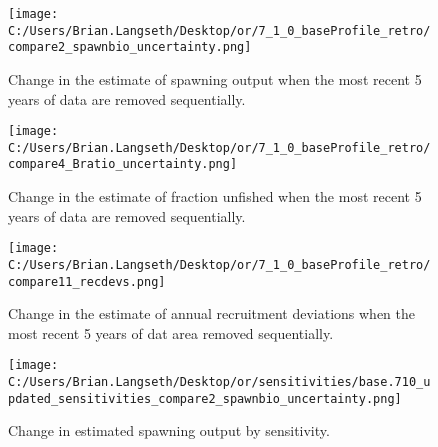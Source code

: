 \documentclass[11pt,
  english,
  a4paper,
]{article}
\begin{document}
\tagmcend\tagstructend


\begin{figure}
\centering
\texttt{[image: C:/Users/Brian.Langseth/Desktop/or/7\_1\_0\_baseProfile\_retro/compare2\_spawnbio\_uncertainty.png]}
\caption{Change in the estimate of spawning output when the most recent 5 years of data are removed sequentially.\label{fig:retro-ssb}}
\end{figure}

\tagmcend\tagstructend


\begin{figure}
\centering
\texttt{[image: C:/Users/Brian.Langseth/Desktop/or/7\_1\_0\_baseProfile\_retro/compare4\_Bratio\_uncertainty.png]}
\caption{Change in the estimate of fraction unfished when the most recent 5 years of data are removed sequentially.\label{fig:retro-depl}}
\end{figure}

\tagmcend\tagstructend


\begin{figure}
\centering
\texttt{[image: C:/Users/Brian.Langseth/Desktop/or/7\_1\_0\_baseProfile\_retro/compare11\_recdevs.png]}
\caption{Change in the estimate of annual recruitment deviations when the most recent 5 years of dat area removed sequentially.\label{fig:retro-recdevs}}
\end{figure}

\tagmcend\tagstructend


\begin{figure}
\centering
\texttt{[image: C:/Users/Brian.Langseth/Desktop/or/sensitivities/base.710\_updated\_sensitivities\_compare2\_spawnbio\_uncertainty.png]}
\caption{Change in estimated spawning output by sensitivity.\label{fig:sens-ssb}}
\end{figure}
\end{document}
